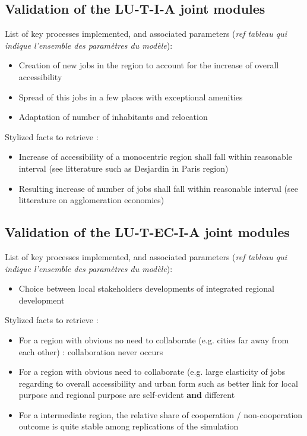 \subsection{Validation of the LU-T-I-A joint modules}


List of key processes implemented, and associated parameters (\textit{ref tableau qui indique l'ensemble des paramètres du modèle}):
\begin{itemize}
\item Creation of new jobs in the region to account for the increase of overall accessibility
\item Spread of this jobs in a few places with exceptional amenities
\item Adaptation of number of inhabitants and relocation
\end{itemize}


Stylized facts to retrieve : 
\begin{itemize}
	\item Increase of accessibility of a monocentric region shall fall within reasonable interval (see litterature such as Desjardin in Paris region) 
	\item Resulting increase of number of jobs shall fall within reasonable interval (see litterature on agglomeration economies)
\end{itemize}





\subsection{Validation of the LU-T-EC-I-A joint modules}

List of key processes implemented, and associated parameters (\textit{ref tableau qui indique l'ensemble des paramètres du modèle}):
\begin{itemize}
	\item Choice between local stakeholders developments of integrated regional development
	
\end{itemize}


Stylized facts to retrieve : 
\begin{itemize}
	\item For a region with obvious no need to collaborate (e.g. cities far away from each other) : collaboration never occurs
	\item For a region with obvious need to collaborate (e.g. large elasticity of jobs regarding to overall accessibility and urban form such as better link for local purpose and regional purpose are self-evident \textbf{and} different
	\item For a intermediate region, the relative share of cooperation / non-cooperation outcome is quite stable among replications of the simulation
\end{itemize}



